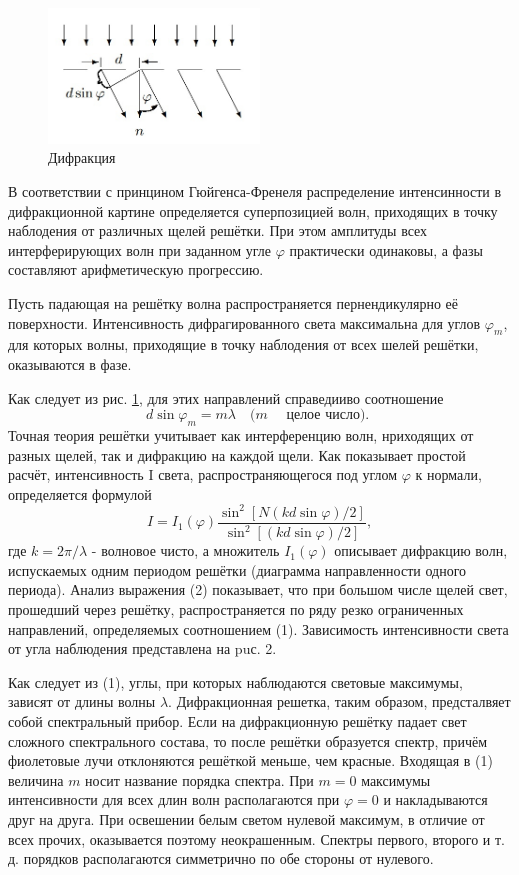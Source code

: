 \documentclass[a4paper, 12pt]{article}
\begin{document}
\begin{figure}[H]
    \centering
    \includegraphics[width=0.5\textwidth]{ris2}
    \caption{Дифракция}
    \label{fig:ris1}
\end{figure}

В соответствии с принцином Гюйгенса-Френеля распределение интенсинности в дифракционной картине определяется суперпозицией волн, приходящих в точку наблодения от различных щелей решётки. При этом амплитуды всех интерферирующих волн при заданном угле $\varphi$ практически одинаковы, а фазы составляют арифметическую прогрессию.

Пусть падающая на решётку волна распространяется пернендикулярно её поверхности. Интенсивность дифрагированного света максимальна для углов $\varphi_m$, для которых волны, приходящие в точку наблодения от всех шелей решётки, оказываются в фазе.

Как следует из рис. \ref{fig:ris1}, для этих направлений справедииво соотношение
\begin{equation}
	d \sin \varphi_m=m \lambda \quad(m \quad \text { целое число). }
\end{equation}
Точная теория решётки учитывает как интерференцию волн, нриходящих от разных щелей, так и дифракцию на каждой щели. Как показывает простой расчёт, интенсивность I света, распространяющегося
под углом $\varphi$ к нормали, определяется формулой
\begin{equation}
I=I_1(\varphi) \frac{\sin ^2[N(k d \sin \varphi) / 2]}{\sin ^2[(k d \sin \varphi) / 2]},
\end{equation}
где $k=2 \pi / \lambda$ - волновое чисто, а множитель $I_1(\varphi)$ описывает дифракцию волн, испускаемых одним периодом решётки (диаграмма направленности одного периода).
Анализ выражения (2) показывает, что при большом числе щелей свет, прошедший через решётку, распространяется по ряду резко ограниченных направлений, определяемых соотношением (1). Зависимость интенсивности света от угла наблюдения представлена на puс. 2.

Как следует из (1), углы, при которых наблюдаются световые максимумы, зависят от длины волны $\lambda$. Дифракционная решетка, таким образом, предсталвяет собой спектральный прибор. Если на дифракционную решётку падает свет сложного спектрального состава, то после решётки образуется спектр, причём фиолетовые лучи отклоняются решёткой меньше, чем красные. 
Входящая в (1) величина $m$ носит название порядка спектра. При $m=0$ максимумы интенсивности для всех длин волн располагаются при $\varphi=0$ и накладываются друг на друга. При освешении белым светом нулевой максимум, в отличие от всех прочих, оказывается поэтому неокрашенным. Спектры первого, второго и т. д. порядков располагаются симметрично по обе стороны от нулевого.
\end{document}

